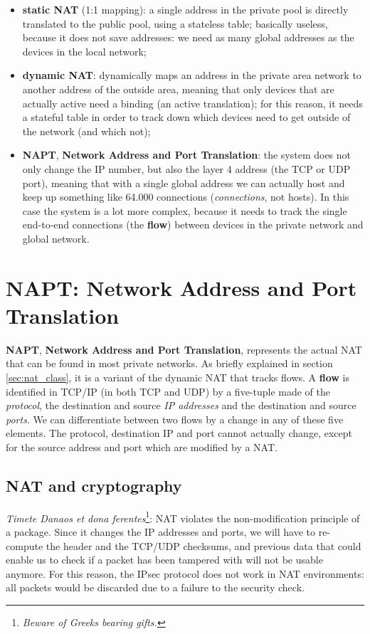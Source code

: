 \begin{itemize}
    \item \textbf{static NAT} (1:1 mapping): a single address in the private pool is directly translated to the public pool, using a stateless table; basically useless, because it does not save addresses: we need as many global addresses as the devices in the local network;
    \item \textbf{dynamic NAT}: dynamically maps an address in the private area network to another address of the outside area, meaning that only devices that are actually active need a binding (an active translation); for this reason, it needs a stateful table in order to track down which devices need to get outside of the network (and which not);
    \item \textbf{NAPT}, \textbf{Network Address and Port Translation}: the system does not only change the IP number, but also the layer 4 address (the TCP or UDP port), meaning that with a single global address we can actually host and keep up something like 64.000 connections (\textit{connections}, not hosts). In this case the system is a lot more complex, because it needs to track the single end-to-end connections (the \textbf{flow}) between devices in the private network and global network.
\end{itemize}


\section{NAPT: Network Address and Port Translation}
\textbf{NAPT}, \textbf{Network Address and Port Translation}, represents the actual NAT that can be found in most private networks. As briefly explained in section \ref{sec:nat_class}, it is a variant of the dynamic NAT that tracks flows. A \textbf{flow} is identified in TCP/IP (in both TCP and UDP) by a five-tuple made of the \textit{protocol}, the destination and source \textit{IP addresses} and the destination and source \textit{ports}. We can differentiate between two flows by a change in any of these five elements. The protocol, destination IP and port cannot actually change, except for the source address and port which are modified by a NAT.


\subsection{NAT and cryptography}
\textit{Timete Danaos et dona ferentes}\footnote{\textit{Beware of Greeks bearing gifts.}}: NAT violates the non-modification principle of a package. Since it changes the IP addresses and ports, we will have to
re-compute the header and the TCP/UDP checksums, and previous data that could enable us to check if a packet has been tampered with will not be usable anymore. For this reason, the IPsec protocol does not work in NAT environments: all packets would be discarded due to a failure to the security check.

